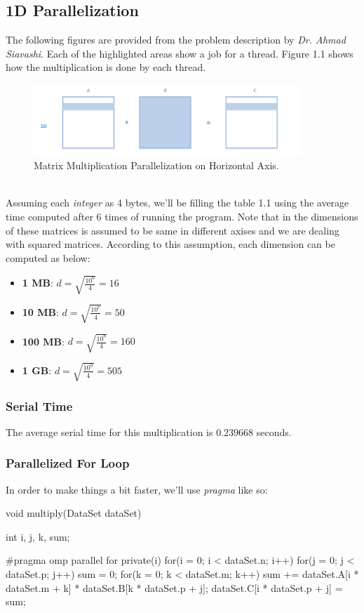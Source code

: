 \documentclass[12pt]{article}
\numberwithin{equation}{section}
\numberwithin{table}{section}
\numberwithin{figure}{section}
\begin{document}
\subsection{1D Parallelization}
The following figures are provided from the problem description by \textit{Dr. Ahmad Siavashi}. Each of the highlighted areas show a job for a thread. Figure 1.1 shows how the multiplication is done by each thread.
\begin{figure}[!h]\centering
	\includegraphics[width=0.9\textwidth]{one_dimensional.png}
	\caption{Matrix Multiplication Parallelization on Horizontal Axis.}
	\label{figsolplot}
\end{figure}\\
Assuming each \textit{integer} as 4 bytes, we'll be filling the table 1.1 using the average time computed after 6 times of running the program. Note that in the dimensions of these matrices is assumed to be same in different axises and we are dealing with squared matrices. According to this assumption, each dimension can be computed as below:
\begin{itemize}
	\item \textbf{1 MB}: $d = \sqrt{\frac{10^6}{4}} = 16$
	\item \textbf{10 MB}: $d = \sqrt{\frac{10^7}{4}} = 50$
	\item \textbf{100 MB}:  $d = \sqrt{\frac{10^8}{4}} = 160$
	\item \textbf{1 GB}:  $d = \sqrt{\frac{10^9}{4}} = 505$
\end{itemize}
\subsubsection{Serial Time}
The average serial time for this multiplication is $0.239668$ seconds.
\subsubsection{Parallelized For Loop}
In order to make things a bit faster, we'll use \textit{pragma} like so:
\begin{cpp}
		void multiply(DataSet dataSet){
			int i, j, k, sum;
			
			#pragma omp parallel for private(i)
			for(i = 0; i < dataSet.n; i++){
				for(j = 0; j < dataSet.p; j++){
					sum = 0;
					for(k = 0; k < dataSet.m; k++){
						sum += dataSet.A[i * dataSet.m + k] * dataSet.B[k * dataSet.p + j];
					}
					dataSet.C[i * dataSet.p + j] = sum;
				}
			}
		}
\end{cpp}
\end{document}

